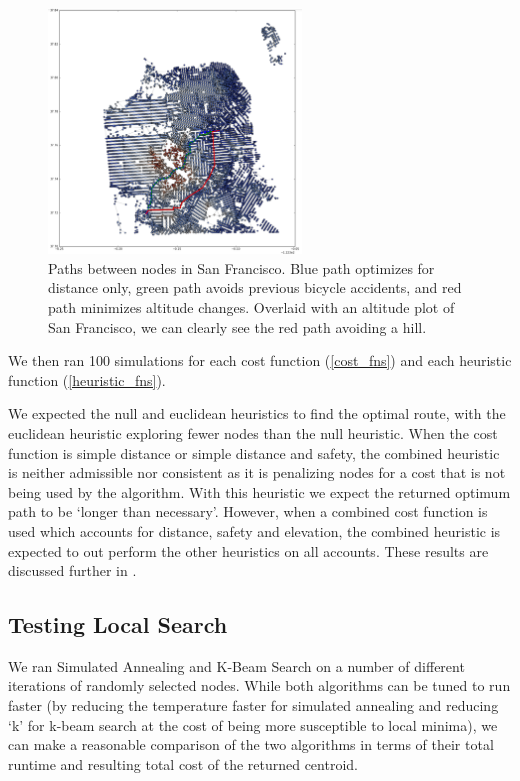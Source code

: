 \documentclass[11pt]{article}
\begin{document}
\begin{figure}
\center
\includegraphics[width=0.6\textwidth]{../images/sf_new_plot_2.png}
\caption{Paths between nodes in San Francisco. Blue path optimizes for distance only, green path avoids previous bicycle accidents, and red path minimizes altitude changes. Overlaid with an altitude plot of San Francisco, we can clearly see the red path avoiding a hill.}
\label{fig:connected_san_fran}
\end{figure}

\par
We then ran 100 simulations for each cost function (\ref{cost_fns}) and each heuristic function (\ref{heuristic_fns}). 

We expected the null and euclidean heuristics to find the optimal route, with the euclidean heuristic exploring fewer nodes than the null heuristic. When the cost function is simple distance or simple distance and safety, the combined heuristic is neither admissible nor consistent as it is penalizing nodes for a cost that is not being used by the algorithm. With this heuristic we expect the returned optimum path to be `longer than necessary'. However, when a combined cost function is used which accounts for distance, safety and elevation, the combined heuristic is expected to out perform the other heuristics on all accounts. These results are discussed further in . 

\subsection{Testing Local Search}

We ran Simulated Annealing and K-Beam Search on a number of different iterations of randomly selected nodes. While both algorithms can be tuned to run faster (by reducing the temperature faster for simulated annealing and reducing `k' for k-beam search at the cost of being more susceptible to local minima), we can make a reasonable comparison of the two algorithms in terms of their total runtime and resulting total cost of the returned centroid.
\end{document}
